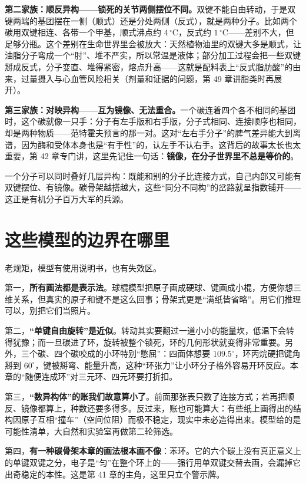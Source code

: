 \textbf{第二家族：顺反异构——锁死的关节两侧摆位不同。}双键不能自由转动，于是双键两端的基团摆在一侧（顺式）还是分处两侧（反式），就是两种分子。比如两个碳用双键相连、各带一个甲基，顺式沸点约 $4\,^{\circ}\mathrm{C}$，反式约 $1\,^{\circ}\mathrm{C}$——差别不大，但足够分瓶。这个差别在生命世界里会被放大：天然植物油里的双键大多是顺式，让油脂分子弯成一个“肘”、堆不严实，所以常温是液体；部分加工过程会把一些双键掰成反式，分子变直、堆得紧密，熔点升高——这就是配料表上“反式脂肪酸”的由来，过量摄入与心血管风险相关（剂量和证据的问题，第 49 章讲脂类时再展开）。

\textbf{第三家族：对映异构——互为镜像、无法重合。}一个碳连着四个各不相同的基团时，这个碳就像一只手：分子有左手版和右手版，分子式相同、连接顺序也相同，却是两种物质——范特霍夫预言的那一对。这对“左右手分子”的脾气差异能大到离谱，因为酶和受体本身也是“有手性”的，认左手不认右手。这背后的故事太长也太重要，第 42 章专门讲，这里先记住一句话：\textbf{镜像，在分子世界里不总是等价的}。

一个分子可以同时叠好几层异构：既能和别的分子比连接方式，自己内部又可能有双键摆位、有镜像。碳骨架越搭越大，这些“同分不同构”的岔路就呈指数铺开——这正是有机分子百万大军的兵源。

\section{这些模型的边界在哪里}

老规矩，模型有使用说明书，也有失效区。

第一，\textbf{所有画法都是表示法}。球棍模型把原子画成硬球、键画成小棍，方便你想三维关系，但真实的原子和键不是这么回事；骨架式更是“满纸皆省略”。用它们推理可以，别把它们当照片。

第二，\textbf{“单键自由旋转”是近似}。转动其实要翻过一道小小的能量坎，低温下会转得犹豫；而一旦碳进了环，旋转被整个锁死，环的几何形状就变得非常重要。另外，三个碳、四个碳咬成的小环特别“憋屈”：四面体想要 $109.5^{\circ}$，环丙烷硬把键角掰到 $60^{\circ}$，键被掰弯、能量升高，这种“环张力”让小环分子格外容易开环反应。本章的“随便连成环”对三元环、四元环要打折扣。

第三，\textbf{“数异构体”的账我们故意算小了}。前面那张表只数了连接方式；若再把顺反、镜像都算上，种数还要多得多。反过来，账也可能算大：有些纸上画得出的结构因原子互相“撞车”（空间位阻）而极不稳定，现实中未必造得出来。模型给的是可能性清单，大自然和实验室再做第二轮筛选。

第四，\textbf{有一种碳骨架本章的画法根本画不像}：苯环。它的六个碳上没有真正意义上的单键双键之分，电子是“匀”在整个环上的——强行用单双键交替去画，会漏掉它出奇稳定的本性。这是第 41 章的主角，这里只立个警示牌。

